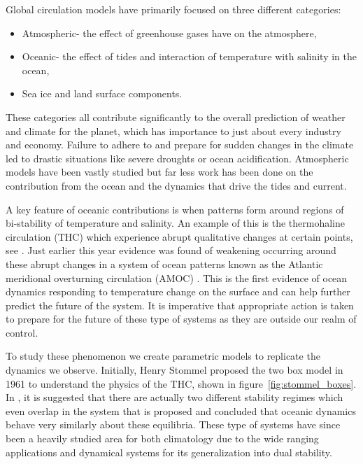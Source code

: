 Global circulation models have primarily focused on three different categories: 
\begin{itemize}
\item Atmospheric- the effect of greenhouse gases have on the atmosphere,
\item Oceanic- the effect of tides and interaction of temperature with salinity in the ocean,
\item Sea ice and land surface components.
\end{itemize}
These categories all contribute significantly to the overall prediction of weather and climate for the planet, which has importance to just about every industry and economy. Failure to adhere to and prepare for sudden changes in the climate led to drastic situations like severe droughts or ocean acidification. Atmospheric models have been vastly studied but far less work has been done on the contribution from the ocean and the dynamics that drive the tides and current.

A key feature of oceanic contributions is when patterns form around regions of bi-stability of temperature and salinity. An example of this is the thermohaline circulation (THC) which experience abrupt qualitative changes at certain points, see \cite{alley2003abrupt,marotzke2000abrupt,rahmstorf2000thermohaline,rahmstorf2002ocean}. Just earlier this year evidence was found of weakening occurring around these abrupt changes in a system of ocean patterns known as the Atlantic meridional overturning circulation (AMOC) \cite{caesar2018AMOC}. This is the first evidence of ocean dynamics responding to temperature change on the surface and can help further predict the future of the system. It is imperative that appropriate action is taken to prepare for the future of these type of systems as they are outside our realm of control. 

To study these phenomenon we create parametric models to replicate the dynamics we observe. Initially, Henry Stommel proposed the two box model in 1961 to understand the physics of the THC, shown in figure~\ref{fig:stommel_boxes}. In \cite{stommel1961thermohaline}, it is suggested that there are actually two different stability regimes which even overlap in the system that is proposed and concluded that oceanic dynamics behave very similarly about these equilibria. These type of systems have since been a heavily studied area for both climatology due to the wide ranging applications and dynamical systems for its generalization into dual stability.

